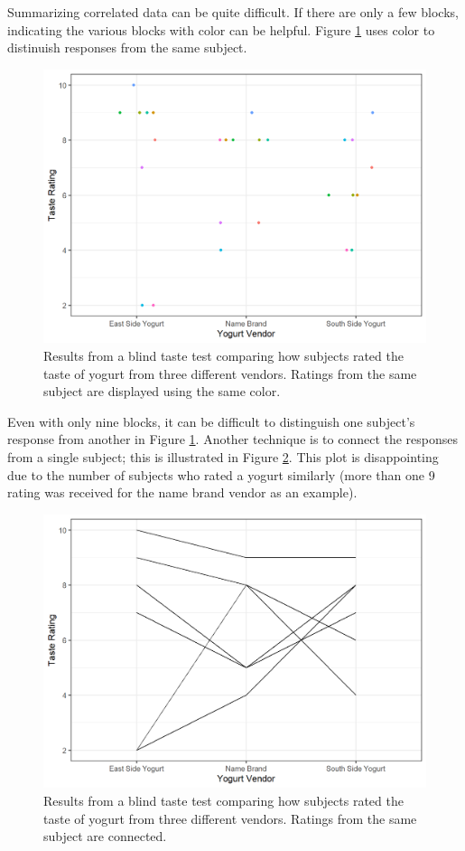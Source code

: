 \documentclass[
]{book}
\theoremstyle{plain}
\theoremstyle{mydefn}
\theoremstyle{myexmpl}
\theoremstyle{remark}
\begin{document}
Summarizing correlated data can be quite difficult. If there are only a few blocks, indicating the various blocks with color can be helpful. Figure \ref{fig:blocksummaries-color-plot} uses color to distinuish responses from the same subject.

\begin{figure}

{\centering \includegraphics[width=0.8\linewidth]{./Images/blocksummaries-color-plot-1} 

}

\caption{Results from a blind taste test comparing how subjects rated the taste of yogurt from three different vendors.  Ratings from the same subject are displayed using the same color.}\label{fig:blocksummaries-color-plot}
\end{figure}

Even with only nine blocks, it can be difficult to distinguish one subject's response from another in Figure \ref{fig:blocksummaries-color-plot}. Another technique is to connect the responses from a single subject; this is illustrated in Figure \ref{fig:blocksummaries-line-plot}. This plot is disappointing due to the number of subjects who rated a yogurt similarly (more than one 9 rating was received for the name brand vendor as an example).

\begin{figure}

{\centering \includegraphics[width=0.8\linewidth]{./Images/blocksummaries-line-plot-1} 

}

\caption{Results from a blind taste test comparing how subjects rated the taste of yogurt from three different vendors.  Ratings from the same subject are connected.}\label{fig:blocksummaries-line-plot}
\end{figure}
\end{document}
